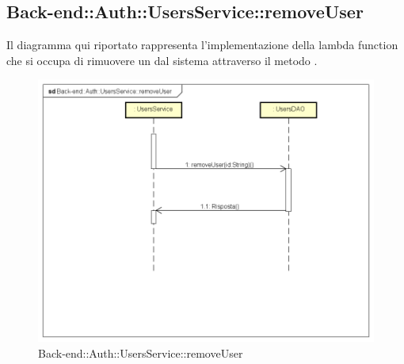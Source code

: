 \subsection{Back-end::Auth::UsersService::removeUser}
Il diagramma qui riportato rappresenta l'implementazione della lambda function che si occupa di rimuovere un  dal sistema attraverso il metodo .
\begin{figure}[h] \centering \includegraphics[width=\textwidth,height=\textheight,keepaspectratio]{images/diagrams/back-end/Ufficial_Backend/Back-endAuthUsersServiceremoveUser.png} 	\caption{Back-end::Auth::UsersService::removeUser}
\end{figure} 
\newpage

